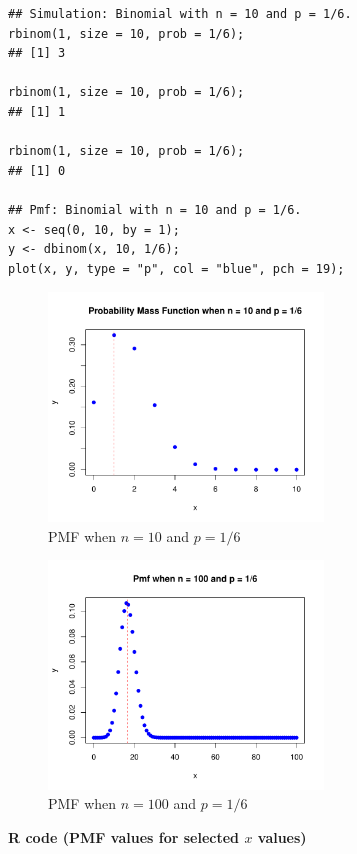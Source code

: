 \begin{tcolorbox}[colback=gray!10, colframe=black!45, arc=2mm]
\begin{verbatim}
## Simulation: Binomial with n = 10 and p = 1/6.
rbinom(1, size = 10, prob = 1/6);
## [1] 3

rbinom(1, size = 10, prob = 1/6);
## [1] 1

rbinom(1, size = 10, prob = 1/6);
## [1] 0

## Pmf: Binomial with n = 10 and p = 1/6.
x <- seq(0, 10, by = 1);
y <- dbinom(x, 10, 1/6);
plot(x, y, type = "p", col = "blue", pch = 19);
\end{verbatim}
\end{tcolorbox}
\vspace{1em}

\begin{figure}[H]
  \centering
  \includegraphics[width=0.65\textwidth]{section11/images/binomial_pmf.pdf}
  \vspace{-1em} %
\captionsetup{skip=0pt}
  \caption{PMF when $n=10$ and $p=1/6$}
\end{figure}

\vspace{1em}

\begin{figure}[H]
  \centering
  \includegraphics[width=0.65\textwidth]{section11/images/binomial_pmf_100.pdf}
  \vspace{-1em} %
\captionsetup{skip=0pt}
  \caption{PMF when $n=100$ and $p=1/6$}
\end{figure}
\vspace{1em}
\noindent\textbf{R code (PMF values for selected $x$ values)}

